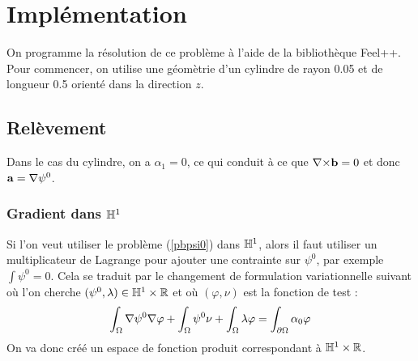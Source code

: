 \chapter{Implémentation}

On programme la résolution de ce problème à l'aide de la bibliothèque Feel++. Pour commencer, on utilise une géomètrie d'un cylindre de rayon 0.05 et de longueur 0.5 orienté dans la direction $z$.
\begin{center}
\end{center}

\section{Relèvement}

Dans le cas du cylindre, on a $\alpha_1=0$, ce qui conduit à ce que ${\nabla\times} \mathbf{b}=0$ et donc $\mathbf{a}={\nabla}\psi^0$.

\subsection{Gradient dans ${\mathbb{H}}^1$}
\label{impGradh1}

Si l'on veut utiliser le problème (\ref{pbpsi0}) dans ${\mathbb{H}}^1$, alors il faut utiliser un multiplicateur de Lagrange pour ajouter une contrainte sur $\psi^0$, par exemple $\int \psi^0 = 0$. Cela se traduit par le changement de formulation variationnelle suivant où l'on cherche $(\psi^0,\lambda)\in {\mathbb{H}}^1\times{\mathbb{R}}$ et où $(\varphi,\nu)$ est la fonction de test :
\[
\int_\Omega{\nabla} \psi^0{\nabla}\varphi + \int_\Omega \psi^0\nu + \int_\Omega \lambda\varphi = \int_{\partial\Omega} \alpha_0\varphi
\]
On va donc créé un espace de fonction produit correspondant à ${\mathbb{H}}^1\times{\mathbb{R}}$.

